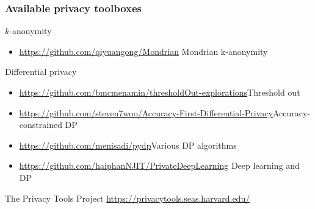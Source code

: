 \begin{frame}
  \frametitle{Available privacy toolboxes}
  \begin{block}{$k$-anonymity}
    \begin{itemize}
    \item \url{https://github.com/qiyuangong/Mondrian} Mondrian k-anonymity
    \end{itemize}
  \end{block}
  \begin{block}{Differential privacy}
    \begin{itemize}
    \item \url{https://github.com/bmcmenamin/thresholdOut-explorations}{Threshold out}
    \item \url{https://github.com/steven7woo/Accuracy-First-Differential-Privacy}{Accuracy-constrained DP}
      \item \url{https://github.com/menisadi/pydp}{Various DP algorithms}
\item \url{https://github.com/haiphanNJIT/PrivateDeepLearning} Deep learning and DP
    \end{itemize}
  \end{block}
  The Privacy Tools Project \url{https://privacytools.seas.harvard.edu/}
\end{frame}



  

